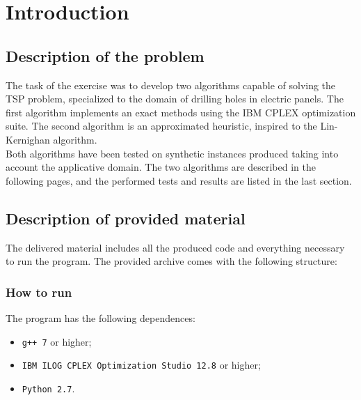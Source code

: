 
\section{Introduction}
\label{chap:introduction}

\subsection{Description of the problem}
The task of the exercise was to develop two algorithms capable of solving the TSP problem, specialized to the domain of drilling holes in electric panels. The first algorithm implements an exact methods using the IBM CPLEX optimization suite. The second algorithm is an approximated heuristic, inspired to the Lin-Kernighan algorithm\cite{LinK73}.\\ Both algorithms have been tested on synthetic instances produced taking into account the applicative domain. The two algorithms are described in the following pages, and the performed tests and results are listed in the last section.

\subsection{Description of provided material}
The delivered material includes all the produced code and everything necessary to run the program.
The provided archive comes with the following structure:
\renewcommand*\DTstylecomment{\rmfamily\color{blue}\textit}

\subsubsection{How to run}
The program has the following dependences:
\begin{itemize}
	\item \texttt{g++ 7} or higher;
	\item \texttt{IBM ILOG CPLEX Optimization Studio 12.8} or higher;
	\item \texttt{Python 2.7}.
\end{itemize}

